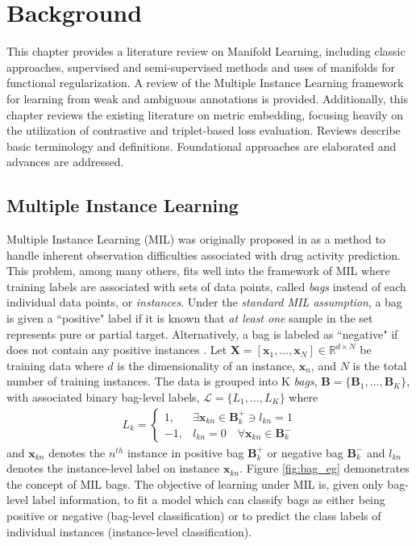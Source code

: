 \chapter{Background}

This chapter provides a literature review on Manifold Learning, including classic approaches, supervised and semi-supervised methods and uses of manifolds for functional regularization.  A review of the Multiple Instance Learning framework for learning from weak and ambiguous annotations is provided. Additionally, this chapter reviews the existing literature on metric embedding, focusing heavily on the utilization of contrastive and triplet-based loss evaluation.  Reviews describe basic terminology and definitions.  Foundational approaches are elaborated and advances are addressed.

\section{Multiple Instance Learning}

Multiple Instance Learning (MIL) was originally proposed in \citep{Dietterich1996AxisParallelRectangles} as a method to handle inherent observation difficulties associated with drug activity prediction.  This problem, among many others, fits well into the framework of MIL where training labels are associated with sets of data points, called \textit{bags} instead of each individual data points, or \textit{instances}.  Under the \textit{standard MIL assumption}, a bag is given a ``positive" label if it is known that  \textit{at least one} sample in the set represents pure or partial target.  Alternatively, a bag is labeled as ``negative" if does not contain any positive instances \citep{Carbonneau2016MILSurvey}.  Let $\bm{X}=[\bm{x}_1,\dots, \bm{x}_N] \in \mathbb{R}^{d \times N}$ be training data where $d$ is the dimensionality of an instance, $\bm{x}_n$, and $N$ is the total number of training instances.  The data is grouped into K \textit{bags}, $\bm{B} = \{\bm{B}_1, \dots, \bm{B}_K\}$, with associated binary bag-level labels, $\mathcal{L} = \{L_1, \dots, L_K \}$ where 
\begin{align}
	L_k = \begin{cases} 
	1, & \exists \bm{x}_{kn} \in \bm{B}^{+}_{k} \ni  l_{kn} = 1\\
	-1, & l_{kn} = 0 \quad \forall \bm{x}_{kn} \in \bm{B}^{-}_{k} 
	\end{cases}
\end{align} and $\bm{x}_{kn}$ denotes the $n^{th}$ instance in positive bag $\bm{B}^{+}_{k}$ or negative bag $\bm{B}^{-}_{k}$ \citep{Zare2016MIACE} and $l_{kn}$ denotes the instance-level label on instance $\bm{x}_{kn}$.  Figure \ref{fig:bag_eg} demonstrates the concept of MIL bags.  The objective of learning under MIL is, given only bag-level label information, to fit a model which can classify bags as either being positive or negative (bag-level classification) or to predict the class labels of individual instances (instance-level classification).

